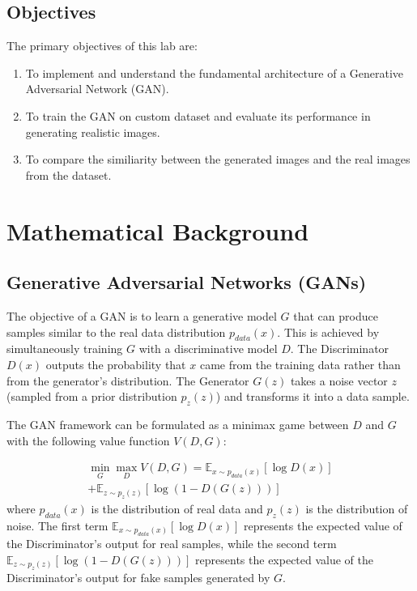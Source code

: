 \documentclass[a4paper, journal]{IEEEtran}
\begin{document}
\subsection{Objectives}
The primary objectives of this lab are:
\begin{enumerate}
    \item To implement and understand the fundamental architecture of a Generative Adversarial Network (GAN).
    \item To train the GAN on custom dataset and evaluate its performance in generating realistic images.
    \item To compare the similiarity between the generated images and the real images from the dataset.
\end{enumerate}

\section{Mathematical Background}

\subsection{Generative Adversarial Networks (GANs)}
The objective of a GAN is to learn a generative model $G$ that can produce samples similar to the real data distribution $p_{data}(x)$. This is achieved by simultaneously training $G$ with a discriminative model $D$. The Discriminator $D(x)$ outputs the probability that $x$ came from the training data rather than from the generator's distribution. The Generator $G(z)$ takes a noise vector $z$ (sampled from a prior distribution $p_z(z)$) and transforms it into a data sample.

The GAN framework can be formulated as a minimax game between $D$ and $G$ with the following value function $V(D, G)$:

\begin{equation}
    \begin{split}
        \min_G \max_D V(D, G) = \mathbb{E}_{x \sim p_{data}(x)}[\log D(x)] \\
        + \mathbb{E}_{z \sim p_z(z)}[\log(1 - D(G(z)))]
        \label{eq:gan_objective}
    \end{split}
\end{equation}
where $p_{data}(x)$ is the distribution of real data and $p_z(z)$ is the distribution of noise. The first term $\mathbb{E}_{x \sim p_{data}(x)}[\log D(x)]$ represents the expected value of the Discriminator's output for real samples, while the second term $\mathbb{E}_{z \sim p_z(z)}[\log(1 - D(G(z)))]$ represents the expected value of the Discriminator's output for fake samples generated by $G$.
\end{document}
